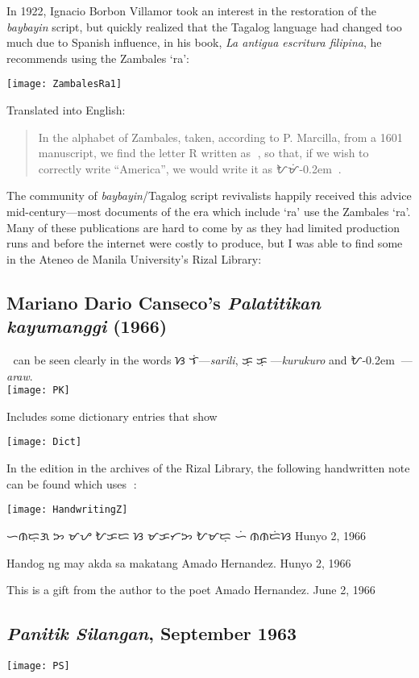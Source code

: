 \documentclass[a4paper,pagesize,openany,14pt,parskip=never]{scrbook}
\newcommand{\≈}{$\approx$}
\begin{document}
In 1922, Ignacio Borbon Villamor took an interest in the restoration of the {\em baybayin} script, but quickly realized that the Tagalog language had changed too much due to Spanish influence, in his book, {\em La antigua escritura filipina}, he recommends using the Zambales `ra':

\texttt{[image: ZambalesRa1]}

Translated into English:

\begin{quote}
    In the alphabet of Zambales, taken, according to P. Marcilla, from a 1601 manuscript, we find the letter R written as {\baybayinh ᜍ}, so that, if we wish to correctly write ``America'', we would write it as {\baybayinh ᜀᜋᜒ\kern-0.2emᜍᜒᜃ}.
\end{quote}

The community of {\em baybayin}/Tagalog script revivalists happily received this advice mid-century---most documents of the era which include `ra' use the Zambales `ra'. Many of these publications are hard to come by as they had limited production runs and before the internet were costly to produce, but I was able to find some in the Ateneo de Manila University's Rizal Library:
\newpage
\subsection{Mariano Dario Canseco's {\em Palatitikan kayumanggi} (1966)}
{\baybayinh ᜍ} can be seen clearly in the words {\baybayinh ᜐᜍᜒᜎᜒ}---{\em sarili}, {\baybayinh ᜃᜓᜍᜓᜃᜓᜍᜓ}---{\em kurukuro} and {\baybayinh ᜀ\kern-0.2emᜍᜏ}---{\em araw}.
 \\
\texttt{[image: PK]}

\newpage
Includes some dictionary entries that show {\baybayinh ᜍ}

\texttt{[image: Dict]}

In the edition in the archives of the Rizal Library, the following handwritten note can be found which uses {\baybayinh ᜍ}:

\texttt{[image: HandwritingZ]}

{\baybayinh ᜑᜈᜇᜓᜄ ᜅ ᜋᜌ ᜀᜃᜇ ᜐ ᜋᜃᜆᜅ ᜀᜋᜇᜓ ᜑᜒᜍᜈᜈᜇᜒᜐ} Hunyo 2, 1966

Handog ng may akda sa makatang Amado Hernandez. Hunyo 2, 1966

This is a gift from the author to the poet Amado Hernandez. June 2, 1966

\subsection{{\em Panitik Silangan}, September 1963}
\texttt{[image: PS]}
\end{document}
